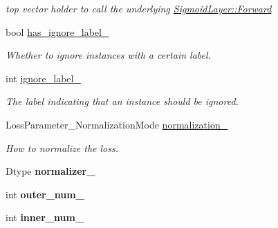 \begin{DoxyCompactItemize}
\begin{DoxyCompactList}\small\item\em top vector holder to call the underlying \hyperlink{classcaffe_1_1Layer_aa5fc9ddb31b58958653372bdaaccde94}{Sigmoid\+Layer\+::\+Forward} \end{DoxyCompactList}\item 
bool \hyperlink{classcaffe_1_1SigmoidCrossEntropyLossLayer_a7e2ebf45542532439096caaec42a2a85}{has\+\_\+ignore\+\_\+label\+\_\+}\hypertarget{classcaffe_1_1SigmoidCrossEntropyLossLayer_a7e2ebf45542532439096caaec42a2a85}{}\label{classcaffe_1_1SigmoidCrossEntropyLossLayer_a7e2ebf45542532439096caaec42a2a85}

\begin{DoxyCompactList}\small\item\em Whether to ignore instances with a certain label. \end{DoxyCompactList}\item 
int \hyperlink{classcaffe_1_1SigmoidCrossEntropyLossLayer_ab99d98ce823df6c90cd4c3cf8b0a793f}{ignore\+\_\+label\+\_\+}\hypertarget{classcaffe_1_1SigmoidCrossEntropyLossLayer_ab99d98ce823df6c90cd4c3cf8b0a793f}{}\label{classcaffe_1_1SigmoidCrossEntropyLossLayer_ab99d98ce823df6c90cd4c3cf8b0a793f}

\begin{DoxyCompactList}\small\item\em The label indicating that an instance should be ignored. \end{DoxyCompactList}\item 
Loss\+Parameter\+\_\+\+Normalization\+Mode \hyperlink{classcaffe_1_1SigmoidCrossEntropyLossLayer_ad4e3c7105f896bd7792e53ef3a0a2dd8}{normalization\+\_\+}\hypertarget{classcaffe_1_1SigmoidCrossEntropyLossLayer_ad4e3c7105f896bd7792e53ef3a0a2dd8}{}\label{classcaffe_1_1SigmoidCrossEntropyLossLayer_ad4e3c7105f896bd7792e53ef3a0a2dd8}

\begin{DoxyCompactList}\small\item\em How to normalize the loss. \end{DoxyCompactList}\item 
Dtype {\bfseries normalizer\+\_\+}\hypertarget{classcaffe_1_1SigmoidCrossEntropyLossLayer_a10169a710108bac27a6548cc66934cb5}{}\label{classcaffe_1_1SigmoidCrossEntropyLossLayer_a10169a710108bac27a6548cc66934cb5}

\item 
int {\bfseries outer\+\_\+num\+\_\+}\hypertarget{classcaffe_1_1SigmoidCrossEntropyLossLayer_a3be5cd5a4489be1439bd796c55c033cf}{}\label{classcaffe_1_1SigmoidCrossEntropyLossLayer_a3be5cd5a4489be1439bd796c55c033cf}

\item 
int {\bfseries inner\+\_\+num\+\_\+}\hypertarget{classcaffe_1_1SigmoidCrossEntropyLossLayer_ad1e5fb747a0272b5fe90d6264615334b}{}\label{classcaffe_1_1SigmoidCrossEntropyLossLayer_ad1e5fb747a0272b5fe90d6264615334b}

\end{DoxyCompactItemize}


